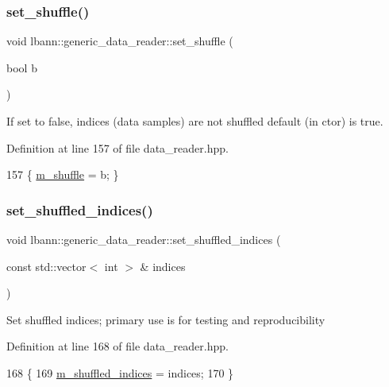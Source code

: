 \subsubsection{\texorpdfstring{set\+\_\+shuffle()}{set\_shuffle()}}
{\footnotesize\ttfamily void lbann\+::generic\+\_\+data\+\_\+reader\+::set\+\_\+shuffle (\begin{DoxyParamCaption}\item[{bool}]{b }\end{DoxyParamCaption})\hspace{0.3cm}{\ttfamily [inline]}}

If set to false, indices (data samples) are not shuffled default (in ctor) is true. 

Definition at line 157 of file data\+\_\+reader.\+hpp.


\begin{DoxyCode}
157 \{ \hyperlink{classlbann_1_1generic__data__reader_a8039ed9c12a5847f0dcf7dd54b8d2f5b}{m\_shuffle} = b; \}
\end{DoxyCode}
\mbox{\label{classlbann_1_1generic__data__reader_ad07a5edb92c3927ef809fca0d95665bc}} 
\subsubsection{\texorpdfstring{set\+\_\+shuffled\+\_\+indices()}{set\_shuffled\_indices()}}
{\footnotesize\ttfamily void lbann\+::generic\+\_\+data\+\_\+reader\+::set\+\_\+shuffled\+\_\+indices (\begin{DoxyParamCaption}\item[{const std\+::vector$<$ int $>$ \&}]{indices }\end{DoxyParamCaption})\hspace{0.3cm}{\ttfamily [inline]}}

Set shuffled indices; primary use is for testing and reproducibility 

Definition at line 168 of file data\+\_\+reader.\+hpp.


\begin{DoxyCode}
168                                                            \{
169     \hyperlink{classlbann_1_1generic__data__reader_aaab6aeff67ffff1c689336851fec2c57}{m\_shuffled\_indices} = indices;
170   \}
\end{DoxyCode}
\mbox{\label{classlbann_1_1generic__data__reader_af2fc6b35ad8139d15729b19db2895827}} 
